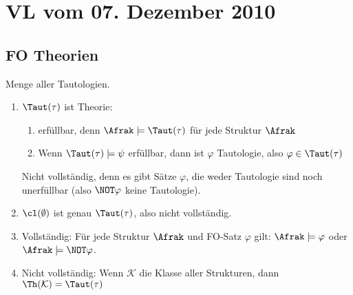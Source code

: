 \section{VL vom 07. Dezember 2010}

\subsection{FO Theorien}
Menge aller Tautologien.
\begin{enumerate}
  \item $\Taut(\tau)$ ist Theorie:
  \begin{enumerate}
    \item erfüllbar, denn $\Afrak\models\Taut(\tau)$ für jede Struktur
    $\Afrak$
    
    \item Wenn $\Taut(\tau)\models\psi$ erfüllbar, dann ist $\varphi$
    Tautologie, also $\varphi\in\Taut(\tau)$
  \end{enumerate}
  
  Nicht vollständig, denn es gibt Sätze $\varphi$, die weder Tautologie
  sind noch unerfüllbar (also $\NOT\varphi$ keine Tautologie).
  
  \item $\cl(\emptyset)$ ist genau $\Taut(\tau)$, also nicht vollständig.
  
  \item Vollständig: Für jede Struktur $\Afrak$ und FO-Satz $\varphi$
  gilt: $\Afrak\models\varphi$ oder $\Afrak\models\NOT\varphi$.
  
  \item Nicht vollständig: Wenn $\mathcal{K}$ die Klasse aller
  Strukturen, dann $\Th(\mathcal{K}) = \Taut(\tau)$
\end{enumerate}

